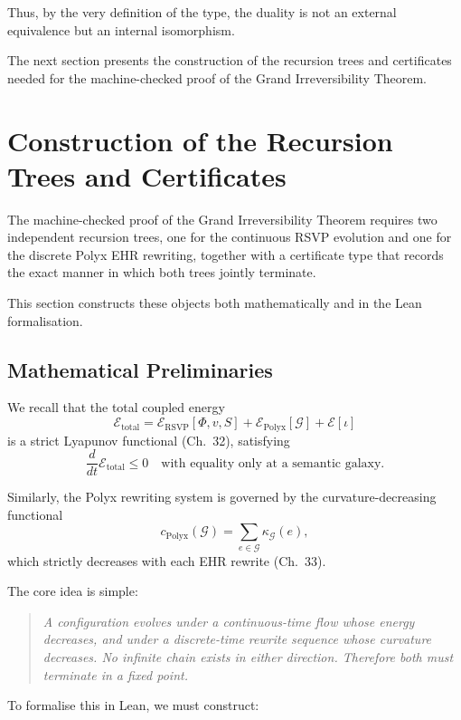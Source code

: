 Thus, by the very definition of the type, the duality is not an external equivalence but an internal isomorphism.

\medskip

The next section presents the construction of the recursion trees and certificates needed for the machine-checked proof of the Grand Irreversibility Theorem.

\section{Construction of the Recursion Trees and Certificates}
\label{sec:66-3}

The machine-checked proof of the Grand Irreversibility Theorem requires two independent recursion trees, one for the continuous RSVP evolution and one for the discrete Polyx EHR rewriting, together with a certificate type that records the exact manner in which both trees jointly terminate.

This section constructs these objects both mathematically and in the Lean formalisation.

\subsection{Mathematical Preliminaries}

We recall that the total coupled energy
\[
   \mathcal{E}_{\mathrm{total}}
      = \mathcal{E}_{\mathrm{RSVP}}[\Phi,v,S]
      + \mathcal{E}_{\mathrm{Polyx}}[\mathcal{G}]
      + \mathcal{E}[\iota]
\]
is a strict Lyapunov functional (Ch.~32), satisfying
\[
   \frac{d}{dt} \mathcal{E}_{\mathrm{total}} \le 0
   \quad \text{with equality only at a semantic galaxy.}
\]

Similarly, the Polyx rewriting system is governed by the curvature-decreasing functional
\[
   c_{\mathrm{Polyx}}(\mathcal{G}) = \sum_{e \in \mathcal{G}} \kappa_{\mathcal{G}}(e),
\]
which strictly decreases with each EHR rewrite (Ch.~33).

The core idea is simple:

\begin{quote}
\emph{A configuration evolves under a continuous-time flow whose energy decreases, and under a discrete-time rewrite sequence whose curvature decreases.  
No infinite chain exists in either direction.  
Therefore both must terminate in a fixed point.}
\end{quote}

To formalise this in Lean, we must construct:

